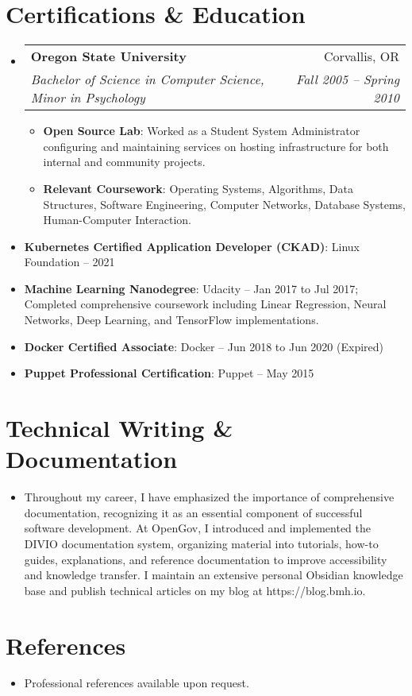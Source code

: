 \documentclass[letterpaper,11pt]{article}
\makeatletter
\newcommand{\resumeItem}[2]{
\item[\textsc{}]\small{
    \textbf{#1}{: #2 \vspace{-2pt}}
  }
}
\newcommand{\resumeSubheading}[4]{
  \vspace{-1pt}\item
    \begin{tabular*}{0.97\textwidth}[t]{l@{\extracolsep{\fill}}r}
      \textbf{#1} & #2 \\
      \textit{\small#3} & \textit{\small #4} \\
    \end{tabular*}\vspace{-5pt}
}
\newcommand{\resumeSubItem}[2]{\resumeItem{#1}{#2}\vspace{-4pt}}
\newcommand{\resumeSubHeadingListStart}{\begin{itemize}[leftmargin=*]}
\newcommand{\resumeSubHeadingListEnd}{\end{itemize}}
\newcommand{\resumeItemListStart}{\begin{itemize}}
\newcommand{\resumeItemListEnd}{\end{itemize}\vspace{-5pt}}
\newcommand{\resumeParagraph}[1]{
  \vspace{-5pt}
  \begin{itemize}[leftmargin=*]
  \item[]
    #1
  \end{itemize}
  \vspace{-5pt}
}
\makeatother
\begin{document}
\section{Certifications \& Education}
\resumeSubHeadingListStart
  \resumeSubheading
    {Oregon State University}{Corvallis, OR}
    {Bachelor of Science in Computer Science, Minor in Psychology}{Fall 2005 -- Spring 2010}
    \resumeItemListStart
      \resumeItem{Open Source Lab}
        {Worked as a Student System Administrator configuring and maintaining services on hosting infrastructure for both internal and community projects.}
      \resumeItem{Relevant Coursework}
        {Operating Systems, Algorithms, Data Structures, Software Engineering, Computer Networks, Database Systems, Human-Computer Interaction.}
    \resumeItemListEnd
  
  \resumeSubItem{Kubernetes Certified Application Developer (CKAD)}
    {Linux Foundation – 2021}
  \resumeSubItem{Machine Learning Nanodegree}
    {Udacity – Jan 2017 to Jul 2017; Completed comprehensive coursework including Linear Regression, Neural Networks, Deep Learning, and TensorFlow implementations.}
  \resumeSubItem{Docker Certified Associate}
    {Docker – Jun 2018 to Jun 2020 (Expired)}
  \resumeSubItem{Puppet Professional Certification}
    {Puppet – May 2015}
\resumeSubHeadingListEnd

\section{Technical Writing \& Documentation}
\resumeParagraph{
Throughout my career, I have emphasized the importance of comprehensive documentation, recognizing it as an essential component of successful software development. At OpenGov, I introduced and implemented the DIVIO documentation system, organizing material into tutorials, how-to guides, explanations, and reference documentation to improve accessibility and knowledge transfer. I maintain an extensive personal Obsidian knowledge base and publish technical articles on my blog at https://blog.bmh.io.
}

\section{References}
\resumeParagraph{
Professional references available upon request.
}
\end{document}
